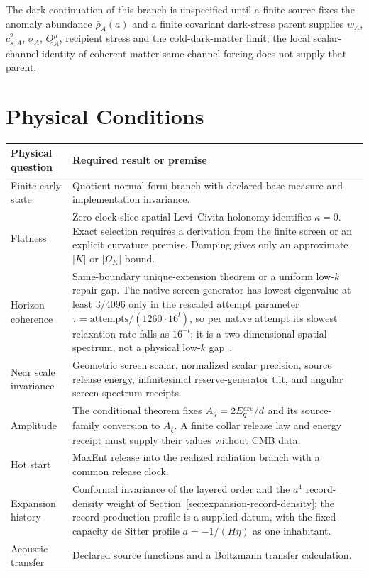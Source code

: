 \documentclass[11pt]{article}
\theoremstyle{remark}
\theoremstyle{plain}
\begin{document}
The dark continuation of this branch is unspecified until a finite source
fixes the anomaly abundance \(\bar\rho_A(a)\) and a finite covariant
dark-stress parent supplies \(w_A\), \(c_{s,A}^2\), \(\sigma_A\),
\(Q_A^\mu\), recipient stress and the cold-dark-matter limit; the local
scalar-channel identity of coherent-matter same-channel forcing does not
supply that parent.

\section{Physical Conditions}

\begin{longtable}{@{}p{}p{}@{}}
\toprule
Physical question & Required result or premise\\
\midrule
\endhead
\bottomrule
\endfoot
Finite early state & Quotient normal-form branch with declared base measure and implementation
invariance.\\
Flatness & Zero clock-slice spatial Levi--Civita holonomy identifies \(\kappa=0\). Exact selection
requires a derivation from the finite screen or an explicit curvature premise. Damping
gives only an approximate \(|K|\) or \(|\Omega_K|\) bound.\\
Horizon coherence & Same-boundary unique-extension theorem or a uniform low-\(k\) repair gap.
The native screen generator has lowest eigenvalue at least \(3/4096\) only
in the rescaled attempt parameter \(\tau=\text{attempts}/(1260\cdot16^l)\),
so per native attempt its slowest relaxation rate falls as \(16^{-l}\); it is
a two-dimensional spatial spectrum, not a physical low-\(k\)
gap~\cite{ophcontinuum,ophtimefields}.\\
Near scale invariance & Geometric screen scalar, normalized scalar precision, source release
energy, infinitesimal reserve-generator tilt, and angular screen-spectrum receipts.\\
Amplitude & The conditional theorem fixes \(A_q=2E_q^{\rm src}/d\) and its source-family
conversion to \(A_\zeta\). A finite collar release law and energy receipt must supply their
values without CMB data.\\
Hot start & MaxEnt release into the realized radiation branch with a common release clock.\\
Expansion history & Conformal invariance of the layered order and the
\(a^4\) record-density weight of Section~\ref{sec:expansion-record-density};
the record-production profile is a supplied datum, with the fixed-capacity
de Sitter profile \(a=-1/(H\eta)\) as one inhabitant.\\
Acoustic transfer & Declared source functions and a Boltzmann transfer calculation.\\
\end{longtable}
\end{document}
